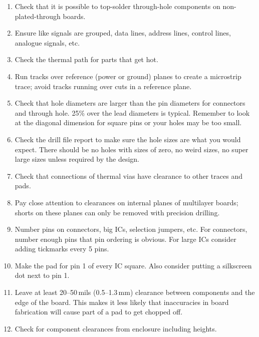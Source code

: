 \begin{enumerate}
\item Check that it is possible to top-solder through-hole components
  on non-plated-through boards.

\item Ensure like signals are grouped, data lines, address lines, control lines, analogue signals, etc.

\item Check the thermal path for parts that get hot.

\item Run tracks over reference (power or ground) planes to create a
  microstrip trace; avoid tracks running over cuts in a reference
  plane.

\item Check that hole diameters are larger than the pin diameters for
  connectors and through hole. 25\% over the lead diameters is
  typical.  Remember to look at the diagonal dimension for square pins
  or your holes may be too small.

\item Check the drill file report to make sure the hole sizes are what
  you would expect. There should be no holes with sizes of zero, no
  weird sizes, no super large sizes unless required by the design.

\item Check that connections of thermal vias have clearance to other
  traces and pads.

\item Pay close attention to clearances on internal planes of
  multilayer boards; shorts on these planes can only be removed with
  precision drilling.

\item Number pins on connectors, big ICs, selection jumpers, etc. For
  connectors, number enough pins that pin ordering is obvious. For
  large ICs consider adding tickmarks every 5 pins.

\item Make the pad for pin 1 of every IC square. Also consider putting
  a silkscreen dot next to pin 1.

\item Leave at least 20--50\,mils (0.5--1.3\,mm) clearance between
  components and the edge of the board. This makes it less likely that
  inaccuracies in board fabrication will cause part of a pad to get
  chopped off.

\item Check for component clearances from enclosure including heights.


\end{enumerate}

